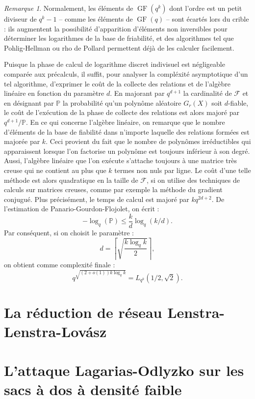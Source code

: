 \documentclass[a4paper, titlepage]{article}
\theoremstyle{definition}
\theoremstyle{remark}
\newtheorem{rema}[theo]{Remarque}
\def\o{o}
\def\gf{\operatorname{GF}}
\begin{document}
\begin{rema}
Normalement, les éléments de $\gf(q^k)$ dont l'ordre est un petit diviseur de $q^k-1$ -- comme les éléments de $\gf(q)$ -- sont écartés lors du crible : ils augmentent la possibilité d'apparition d'éléments non inversibles pour déterminer les logarithmes de la base de friabilité, et des algorithmes tel que Pohlig-Hellman \cite{pohligHellman1978} ou rho de Pollard \cite{pollard1978} permettent déjà de les calculer facilement.
\end{rema}

Puisque la phase de calcul de logarithme discret indivisuel est négligeable comparée aux précalculs, il suffit, pour analyser la compléxité asymptotique d'un tel algorithme, d'exprimer le coût de la collecte des relations et de l'algèbre linéaire en fonction du paramètre $d$. En majorant par $q^{d+1}$ la cardinalité de $\mathcal{F}$ et en désignant par $\mathbb{P}$ la probabilité qu'un polynôme aléatoire $G_r(X)$ soit $d$-fiable, le coût de l'exécution de la phase de collecte des relations est alors majoré par $q^{d+1}/\mathbb{P}$. En ce qui concerne l'algèbre linéaire, on remarque que le nombre d'éléments de la base de fiabilité dans n'importe laquelle des relations formées est majorée par $k$. Ceci provient du fait que le nombre de polynômes irréductibles qui apparaissent lorsque l'on factorise un polynôme est toujours inférieur à son degré. Aussi, l’algèbre linéaire que l'on exécute s'attache toujours à une matrice très creuse qui ne contient au plus que $k$ termes non nuls par ligne. Le coût d'une telle méthode est alors quadratique en la taille de $\mathcal{F}$, si on utilise des techniques de calculs sur matrices creuses, comme par exemple la méthode du gradient conjugué. Plus précisément, le temps de calcul est majoré par $kq^{2d+2}$. De l'estimation de Panario-Gourdon-Flojolet, on écrit :
$$-\log_q(\mathbb{P}) \leqslant\frac{k}{d}\log_q(k/d).$$
Par conséquent, si on choisit le paramètre :
$$d = \left\lceil \sqrt{ \frac{k\log_q k}{2} } \right\rceil,$$
on obtient comme complexité finale :
$$q^{\sqrt{(2+\o(1))k\log_qk}} = L_{q^k}(1/2,\sqrt 2).$$

\section{La réduction de réseau Lenstra-Lenstra-Lov\'asz}

\section{L'attaque Lagarias-Odlyzko sur les sacs à dos à densité faible}
\end{document}
